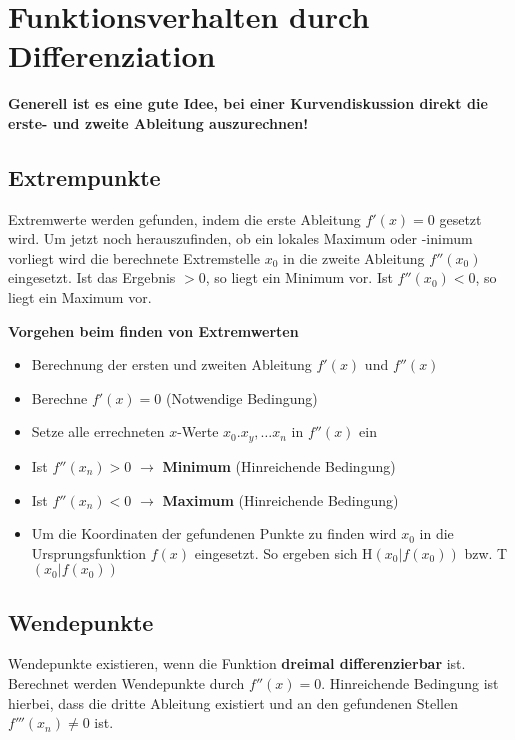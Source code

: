 \documentclass[12pt, a4paper]{scrreprt}
\begin{document}
\section{Funktionsverhalten durch Differenziation}

\begin{framed}
  \textbf{Generell ist es eine gute Idee, bei einer Kurvendiskussion direkt die erste- und zweite Ableitung auszurechnen!}
\end{framed}


\subsection{Extrempunkte}

Extremwerte werden gefunden, indem die erste Ableitung \(f'(x) = 0\) gesetzt wird. Um jetzt noch herauszufinden, ob ein lokales Maximum  oder -inimum vorliegt wird die berechnete Extremstelle \(x_0\) in die zweite Ableitung \(f''(x_0)\) eingesetzt. Ist das Ergebnis \(>0\), so liegt ein Minimum vor. Ist \(f''(x_0) < 0\), so liegt ein Maximum vor.

\begin{framed}
  \textbf{Vorgehen beim finden von Extremwerten}

  \begin{itemize}
  \item Berechnung der ersten und zweiten Ableitung \(f'(x)\) und \(f''(x)\)
  \item Berechne \(f'(x) = 0\) (Notwendige Bedingung)
  \item Setze alle errechneten \(x\)-Werte \(x_0. x_y, \dots x_n\) in \(f''(x)\) ein
  \item Ist \(f''(x_n) > 0\) $\rightarrow$ \textbf{Minimum} (Hinreichende Bedingung)
  \item Ist \(f''(x_n) < 0\) $\rightarrow$ \textbf{Maximum} (Hinreichende Bedingung)
  \item Um die Koordinaten der gefundenen Punkte zu finden wird \(x_0\) in die Ursprungsfunktion \(f(x)\) eingesetzt. So ergeben sich H\((x_0|f(x_0))\) bzw. T\((x_0|f(x_0))\)
  \end{itemize}
\end{framed}

\subsection{Wendepunkte}

Wendepunkte existieren, wenn die Funktion \textbf{dreimal differenzierbar} ist. Berechnet werden Wendepunkte durch \(f''(x) = 0\). Hinreichende Bedingung ist hierbei, dass die dritte Ableitung existiert und an den gefundenen Stellen \(f'''(x_n) \neq 0\) ist.
\end{document}
